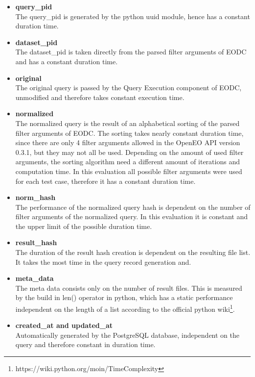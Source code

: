 \documentclass[draft,final]{vutinfth} %
\begin{document}
\begin{itemize}
	\item \textbf{query\_pid} \\
	The query\_pid is generated by the python uuid module, hence has a constant duration time.
	\item \textbf{dataset\_pid} \\
	The dataset\_pid is taken directly from the parsed filter arguments of EODC and has a constant duration time.
	\item \textbf{original} \\
	The original query is passed by the Query Execution component of EODC, unmodified and therefore takes constant execution time.
	\item \textbf{normalized} \\
	The normalized query is the result of an alphabetical sorting of the parsed filter arguments of EODC. The sorting takes nearly constant duration time, since there are only 4 filter arguments allowed in the OpenEO API version 0.3.1, but they may not all be used. Depending on the amount of used filter arguments, the sorting algorithm need a different amount of iterations and computation time. In this evaluation all possible filter arguments were used for each test case, therefore it has a constant duration time.  
	\item \textbf{norm\_hash} \\
	The performance of the normalized query hash is dependent on the number of filter arguments of the normalized query. In this evaluation it is constant and the upper limit of the possible duration time. 
	\item \textbf{result\_hash} \\
	The duration of the result hash creation is dependent on the resulting file list. It takes the most time in the query record generation and.
	\item \textbf{meta\_data} \\
	The meta data consists only on the number of result files. This is measured by the build in len() operator in python, which has a static performance independent on the length of a list according to the official python wiki\footnote{https://wiki.python.org/moin/TimeComplexity}.
	\item \textbf{created\_at and updated\_at} \\
	Automatically generated by the PostgreSQL database, independent on the query and therefore constant in duration time. 
\end{itemize}
\end{document}
